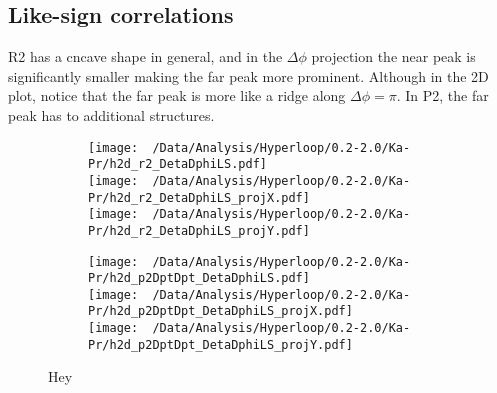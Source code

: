 \documentclass[12pt,a4paper,twoside]{report}
\begin{document}
\subsection{Like-sign correlations}
R2 has a cncave shape in general, and in the $\Delta\phi$ projection the near peak is significantly smaller making the far peak more prominent. Although in the 2D plot, notice that the far peak is more like a ridge along $\Delta\phi=\pi$. In P2, the far peak has to additional structures.
\begin{figure}[H]
	\begin{subfigure}{0.49\linewidth}
		\texttt{[image: ~/Data/Analysis/Hyperloop/0.2-2.0/Ka-Pr/h2d\_r2\_DetaDphiLS.pdf]}\\
		\texttt{[image: ~/Data/Analysis/Hyperloop/0.2-2.0/Ka-Pr/h2d\_r2\_DetaDphiLS\_projX.pdf]}\\
		\texttt{[image: ~/Data/Analysis/Hyperloop/0.2-2.0/Ka-Pr/h2d\_r2\_DetaDphiLS\_projY.pdf]}\\
	\end{subfigure}
	\begin{subfigure}{0.49\linewidth}
		\texttt{[image: ~/Data/Analysis/Hyperloop/0.2-2.0/Ka-Pr/h2d\_p2DptDpt\_DetaDphiLS.pdf]}\\
		\texttt{[image: ~/Data/Analysis/Hyperloop/0.2-2.0/Ka-Pr/h2d\_p2DptDpt\_DetaDphiLS\_projX.pdf]}\\
		\texttt{[image: ~/Data/Analysis/Hyperloop/0.2-2.0/Ka-Pr/h2d\_p2DptDpt\_DetaDphiLS\_projY.pdf]}\\
	\end{subfigure}
	\caption{Hey}
\end{figure}
\end{document}
